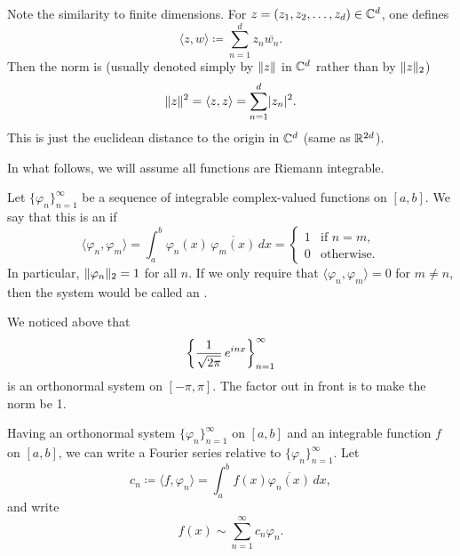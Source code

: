 \begin{remark}
Note the similarity to finite dimensions.
For $z = (z_1,z_2,\ldots,z_d) \in {\mathbb{C}}^d$, one defines
\begin{equation*}
\langle z , w \rangle \coloneqq
\sum_{n=1}^d z_n \overline{w_n} .
\end{equation*}
Then the norm is (usually denoted simply by $\lVert {z} \rVert$ in ${\mathbb{C}}^d$
rather than by $\lVert {z} \rVert_2$)
\begin{equation*}
\snorm{z}^2 = 
\langle z , z \rangle =
\sum_{n=1}^d \sabs{z_n}^2 .
\avoidbreak
\end{equation*}
This is just the euclidean distance to the origin in ${\mathbb{C}}^d$ (same as
${\mathbb{R}}^{2d}$).
\end{remark}

In what follows, we will
assume all functions are Riemann integrable.

\begin{defn}
Let $\{ \varphi_n \}_{n=1}^\infty$ be a sequence of integrable complex-valued
functions on $[a,b]$.  We say that this is an
\emph{} if
\begin{equation*}
\langle \varphi_n , \varphi_m \rangle
=
\int_a^b \varphi_n(x) \, \overline{\varphi_m(x)} \, dx
= 
\begin{cases}
1 & \text{if } n=m, \\
0 & \text{otherwise.}
\end{cases}
\end{equation*}
In particular, $\lVert {\varphi_n} \rVert_2 = 1$ for all $n$.  If we
only require that 
$\langle \varphi_n , \varphi_m \rangle = 0$ for $m\not= n$, then
the system would be called an \emph{}.
\end{defn}

We noticed above that
\begin{equation*}
{\left\{ \frac{1}{\sqrt{2\pi}} \, e^{inx} \right\}}_{n=1}^\infty
\avoidbreak
\end{equation*}
is an orthonormal system on $[-\pi,\pi]$.
The factor out in front is to make the norm be 1.

Having an orthonormal system $\{ \varphi_n \}_{n=1}^\infty$ on $[a,b]$ and an integrable function $f$
on $[a,b]$, we can write
a Fourier series relative to $\{ \varphi_n \}_{n=1}^\infty$.  Let
\begin{equation*}
c_n \coloneqq
\langle f , \varphi_n \rangle
=
\int_a^b f(x) \overline{\varphi_n(x)} \, dx ,
\end{equation*}
and write
\begin{equation*}
f(x) \sim \sum_{n=1}^\infty c_n \varphi_n .
\end{equation*}

